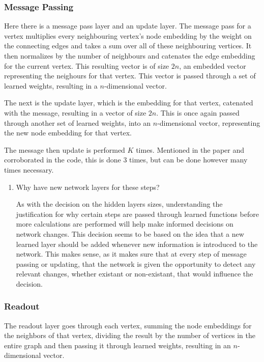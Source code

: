 \documentclass{article}
\begin{document}
\subsubsection{Message Passing}

Here there is a message pass layer and an update layer. The message pass for a vertex multiplies every neighbouring vertex's node embedding by the weight on the connecting edges and takes a sum over all of these neighbouring vertices. It then normalizes by the number of neighbours and catenates the edge embedding for the current vertex. This resulting vector is of size $2n$, an embedded vector representing the neighours for that vertex. This vector is passed through a set of learned weights, resulting in a $n$-dimensional vector. 

The next is the update layer, which is the embedding for that vertex, catenated with the message, resulting in a vector of size $2n$. This is once again passed through another set of learned weights, into an $n$-dimensional vector, representing the new node embedding for that vertex. 

The message then update is performed $K$ times. Mentioned in the paper and corroborated in the code, this is done 3 times, but can be done however many times necessary.

\begin{enumerate}
    \item Why have new network layers for these steps?
    
    As with the decision on the hidden layers sizes, understanding the justification for why certain steps are passed through learned functions before more calculations are performed will help make informed decisions on network changes. This decision seems to be based on the idea that a new learned layer should be added whenever new information is introduced to the network. This makes sense, as it makes sure that at every step of message passing or updating, that the network is given the opportunity to detect any relevant changes, whether existant or non-existant, that would influence the decision. 
\end{enumerate}

\subsubsection{Readout}

The readout layer goes through each vertex, summing the node embeddings for the neighbors of that vertex, dividing the result by the number of vertices in the entire graph and then passing it through learned weights, resulting in an $n$-dimensional vector.
\end{document}
